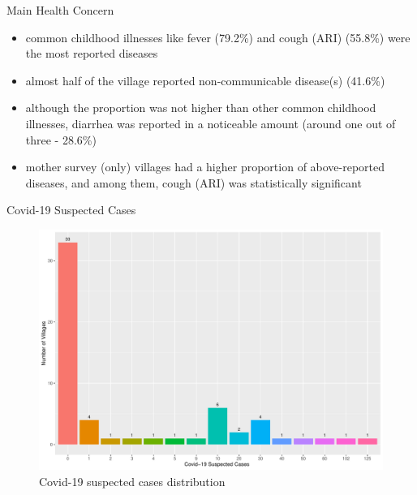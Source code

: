 \documentclass[
  ignorenonframetext,
]{beamer}
\providecommand{\tightlist}{%
  \setlength{\itemsep}{0pt}\setlength{\parskip}{0pt}}
\begin{document}
\begin{frame}{Main Health Concern}
\protect\hypertarget{main-health-concern}{}
\begin{itemize}
\tightlist
\item
  common childhood illnesses like fever (79.2\%) and cough (ARI)
  (55.8\%) were the most reported diseases\\
\item
  almost half of the village reported non-communicable disease(s)
  (41.6\%)\\
\item
  although the proportion was not higher than other common childhood
  illnesses, diarrhea was reported in a noticeable amount (around one
  out of three - 28.6\%)\\
\item
  mother survey (only) villages had a higher proportion of
  above-reported diseases, and among them, cough (ARI) was statistically
  significant
\end{itemize}
\end{frame}

\begin{frame}{Covid-19 Suspected Cases}
\protect\hypertarget{covid}{}
\begin{figure}
\includegraphics[width=1\linewidth]{example_plots_files/figure-beamer/unnamed-chunk-8-1} \caption{Covid-19 suspected cases distribution}\label{fig:unnamed-chunk-8}
\end{figure}
\end{frame}
\end{document}
